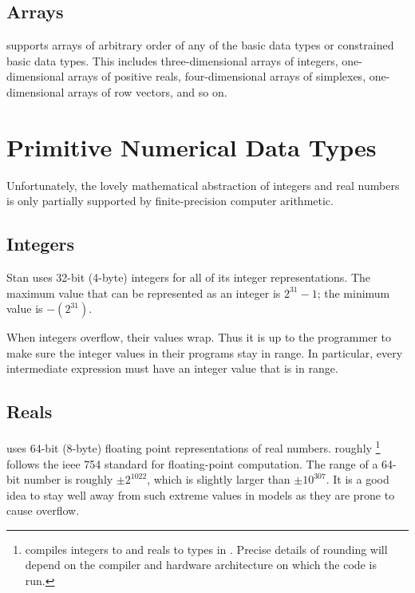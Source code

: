\subsection{Arrays}

\Stan supports arrays of arbitrary order of any of the basic data
types or constrained basic data types.  This includes
three-dimensional arrays of integers, one-dimensional arrays of
positive reals, four-dimensional arrays of simplexes, one-dimensional
arrays of row vectors, and so on.



\section{Primitive Numerical Data Types}

Unfortunately, the lovely mathematical abstraction of integers and
real numbers is only partially supported by finite-precision computer
arithmetic.  

\subsection{Integers}\label{int-data-type.section}

Stan uses 32-bit (4-byte) integers for all of its integer
representations.  The maximum value that can be represented
as an integer is $2^{31}-1$; the minimum value is $-(2^{31})$.

When integers overflow, their values wrap.  Thus it is up to the \Stan
programmer to make sure the integer values in their programs stay in
range.  In particular, every intermediate expression must have an
integer value that is in range.

\subsection{Reals}\label{real-data-type.section}

\Stan uses 64-bit (8-byte) floating point representations of real
numbers.  \Stan roughly%
%
\footnote{\Stan compiles integers to  and reals to
   types in \Cpp.  Precise details of rounding will depend
  on the compiler and hardware architecture on which the code is run.}
%
follows the {\sc ieee} 754 standard for floating-point computation.
The range of a 64-bit number is roughly $\pm 2^{1022}$, which is
slightly larger than $\pm 10^{307}$.  It is a good idea to stay well
away from such extreme values in \Stan models as they are prone to
cause overflow.

